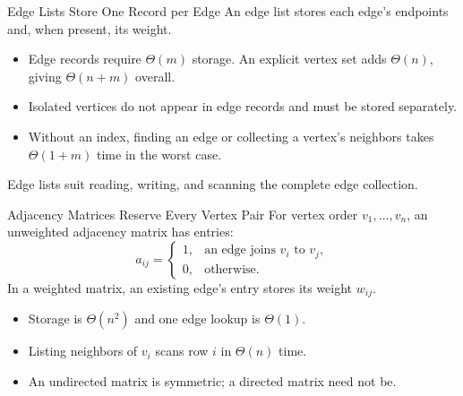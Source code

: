 \documentclass[aspectratio=169,11pt]{beamer}
\begin{document}
\begin{frame}{Edge Lists Store One Record per Edge}
  An edge list stores each edge's endpoints and, when present, its weight.

  \vspace{0.8em}
  \begin{itemize}\setlength{\itemsep}{0.8em}
    \item Edge records require $\Theta(m)$ storage. An explicit vertex set adds
      $\Theta(n)$, giving $\Theta(n+m)$ overall.
    \item Isolated vertices do not appear in edge records and must be stored separately.
    \item Without an index, finding an edge or collecting a vertex's neighbors
      takes $\Theta(1+m)$ time in the worst case.
  \end{itemize}

  \vspace{0.5em}
  Edge lists suit reading, writing, and scanning the complete edge collection.
\end{frame}

\begin{frame}{Adjacency Matrices Reserve Every Vertex Pair}
  For vertex order $v_1,\ldots,v_n$, an unweighted adjacency matrix has entries:
  \[
    a_{ij}=\begin{cases}
      1, & \text{an edge joins }v_i\text{ to }v_j,\\
      0, & \text{otherwise}.
    \end{cases}
  \]
  In a weighted matrix, an existing edge's entry stores its weight $w_{ij}$.

  \vspace{0.5em}
  \begin{itemize}\setlength{\itemsep}{0.55em}
    \item Storage is $\Theta(n^2)$ and one edge lookup is $\Theta(1)$.
    \item Listing neighbors of $v_i$ scans row $i$ in $\Theta(n)$ time.
    \item An undirected matrix is symmetric; a directed matrix need not be.
  \end{itemize}

\end{frame}
\end{document}
